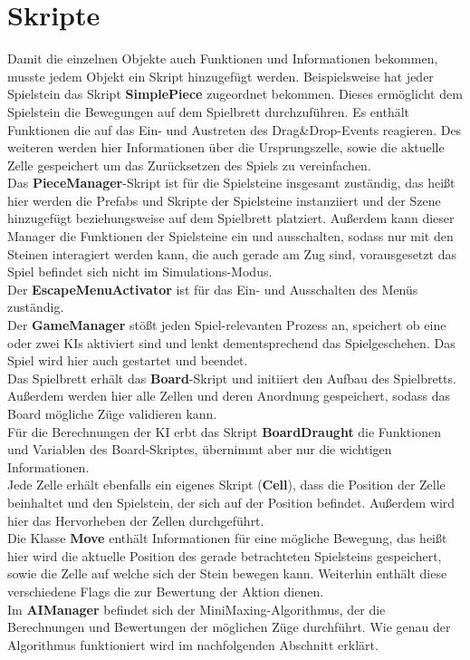 \section{Skripte}
\label{ch:Implementierung:sec:Skripte}
Damit die einzelnen Objekte auch Funktionen und Informationen bekommen, musste jedem Objekt ein Skript hinzugefügt werden.
Beispielsweise hat jeder Spielstein das Skript \textbf{SimplePiece} zugeordnet bekommen. Dieses ermöglicht dem Spielstein die Bewegungen auf dem Spielbrett durchzuführen. Es enthält Funktionen die auf das Ein- und Austreten des Drag\&Drop-Events reagieren. Des weiteren werden hier Informationen über die Ursprungszelle, sowie die aktuelle Zelle gespeichert um das Zurücksetzen des Spiels zu vereinfachen. \\
Das \textbf{PieceManager}-Skript ist für die Spielsteine insgesamt zuständig, das heißt hier werden die Prefabs und Skripte der Spielsteine instanziiert und der Szene hinzugefügt beziehungsweise auf dem Spielbrett platziert. Außerdem kann dieser Manager die Funktionen der Spielsteine ein und ausschalten, sodass nur mit den Steinen interagiert werden kann, die auch gerade am Zug sind, vorausgesetzt das Spiel befindet sich nicht im Simulations-Modus.\\
Der \textbf{EscapeMenuActivator} ist für das Ein- und Ausschalten des Menüs zuständig.\\
Der \textbf{GameManager} stößt jeden Spiel-relevanten Prozess an, speichert ob eine oder zwei KIs aktiviert sind und lenkt dementsprechend das Spielgeschehen. Das Spiel wird hier auch gestartet und beendet.\\
Das Spielbrett erhält das \textbf{Board}-Skript und initiiert den Aufbau des Spielbretts. Außerdem werden hier alle Zellen und deren Anordnung gespeichert, sodass das Board mögliche Züge validieren kann.\\
Für die Berechnungen der KI erbt das Skript \textbf{BoardDraught} die Funktionen und Variablen des Board-Skriptes, übernimmt aber nur die wichtigen Informationen.\\
Jede Zelle erhält ebenfalls ein eigenes Skript (\textbf{Cell}), dass die Position der Zelle beinhaltet und den Spielstein, der sich auf der Position befindet. Außerdem wird hier das Hervorheben der Zellen durchgeführt.\\
Die Klasse \textbf{Move} enthält Informationen für eine mögliche Bewegung, das heißt hier wird die aktuelle Position des gerade betrachteten Spielsteins gespeichert, sowie die Zelle auf welche sich der Stein bewegen kann. Weiterhin enthält diese verschiedene Flags die zur Bewertung der Aktion dienen.\\
Im \textbf{AIManager} befindet sich der MiniMaxing-Algorithmus, der die Berechnungen und Bewertungen der möglichen Züge durchführt. Wie genau der Algorithmus funktioniert wird im nachfolgenden Abschnitt erklärt.

